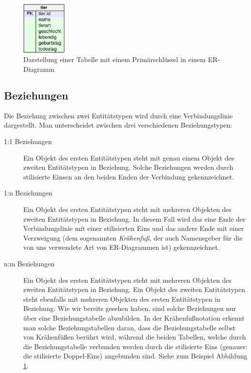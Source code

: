 \begin{figure}[h]
  \centering
   \includegraphics[width=0.20\textwidth]{./inf/SEKII/34_SQL_ER-Diagramme/ermTier}
   \caption{Darstellung einer Tabelle mit einem Primärschlüssel in einem
   ER-Diagramm}
   \label{fig:erstes-er-diagramm}
\end{figure}

\subsection{Beziehungen}

Die Beziehung zwischen zwei Entitätstypen wird durch eine Verbindungslinie
dargestellt. Man unterscheidet zwischen drei verschiedenen Beziehungstypen:

\begin{description}
\item[1:1 Beziehungen]
Ein Objekt des ersten Entitätstypen steht mit genau einem Objekt des zweiten
Entitätstypen in Beziehung. Solche Beziehungen werden durch stilisierte Einsen
an den beiden Enden der Verbindung gekennzeichnet.

\item[1:n Beziehungen]
Ein Objekt des ersten Entitätstypen steht mit mehreren Objekten des zweiten
Entitätstypen in Beziehung. In diesem Fall wird das eine Ende der
Verbindungslinie mit einer stilisierten Eins und das andere Ende mit einer
Verzweigung (dem sogenannten \textit{Krähenfuß}, der auch Namensgeber für
die von uns verwendete Art von ER-Diagrammen ist) gekennzeichnet.

\item[n:m Beziehungen]
Ein Objekt des ersten Entitätstypen steht mit mehreren Objekten des zweiten
Entitätstypen in Beziehung. Ein Objekt des zweiten Entitätstypen steht ebenfalls
mit mehreren Objekten des ersten Entitätstypen in Beziehung. Wie wir bereits
gesehen haben, sind solche Beziehungen nur über eine Beziehungstabelle
abzubilden. In der Krähenfußnotation erkennt man solche Beziehungstabellen
daran, dass die Beziehungstabelle selbst von Krähenfüßen berührt wird, während
die beiden Tabellen, welche durch die Beziehungstabelle verbunden werden durch
die stilisierte Eins (genauer: die stilisierte Doppel-Eins) angebunden sind.
Siehe zum Beispiel Abbildung \ref{fig:erstes-er-diagramm}.
\end{description}

